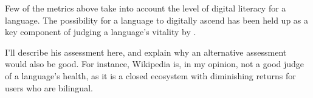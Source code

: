 Few of the metrics above take into account the level of digital literacy for a language. The possibility for a language to digitally ascend has been held up as a key component of judging a language's vitality by \citet{kornai2013digital}. %


I'll describe his assessment here, and explain why an alternative assessment would also be good. For instance, Wikipedia is, in my opinion, not a good judge of a language's health, as it is a closed ecosystem with diminishing returns for users who are bilingual.



